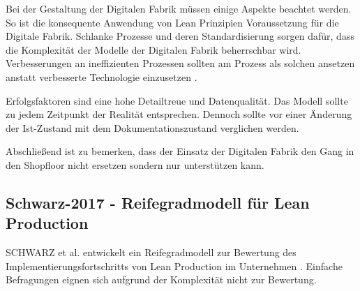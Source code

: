 Bei der Gestaltung der Digitalen Fabrik müssen einige Aspekte beachtet werden. So ist die konsequente Anwendung von Lean Prinzipien Voraussetzung für die Digitale Fabrik. Schlanke Prozesse und deren Standardisierung sorgen dafür, dass die Komplexität der Modelle der Digitalen Fabrik beherrschbar wird. 
Verbesserungen an ineffizienten Prozessen sollten am Prozess als solchen ansetzen anstatt verbesserte Technologie einzusetzen \autocite{Liker2013}. 

Erfolgsfaktoren sind eine hohe Detailtreue und Datenqualität. Das Modell sollte zu jedem Zeitpunkt der Realität entsprechen. Dennoch sollte vor einer Änderung der Ist-Zustand mit dem Dokumentationszustand verglichen werden. 

Abschließend ist zu bemerken, dass der Einsatz der Digitalen Fabrik den Gang in den Shopfloor nicht ersetzen sondern nur unterstützen kann. 


\subsection*{Schwarz-2017 - Reifegradmodell für Lean Production}\label{sec:rgmodell}

SCHWARZ et al. entwickelt ein Reifegradmodell zur Bewertung des Implementierungsfortschritts von Lean Production im Unternehmen \autocite{Schwarz2017}. Einfache Befragungen eignen sich aufgrund der Komplexität nicht zur Bewertung. 

